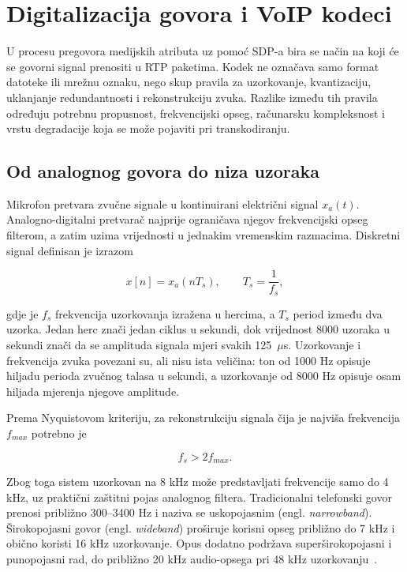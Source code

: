 \chapter{Digitalizacija govora i VoIP kodeci}
\label{ch:kodeci}

U procesu pregovora medijskih atributa uz pomoć SDP-a bira se način na koji će se govorni signal prenositi u RTP paketima. Kodek ne označava samo format datoteke ili mrežnu oznaku, nego skup pravila za uzorkovanje, kvantizaciju, uklanjanje redundantnosti i rekonstrukciju zvuka. Razlike između tih pravila određuju potrebnu propusnost, frekvencijski opseg, računarsku kompleksnost i vrstu degradacije koja se može pojaviti pri transkodiranju.

\section{Od analognog govora do niza uzoraka}

Mikrofon pretvara zvučne signale u kontinuirani električni signal $x_a(t)$. Analogno-digitalni pretvarač najprije ograničava njegov frekvencijski opseg filterom, a zatim uzima vrijednosti u jednakim vremenskim razmacima. Diskretni signal definisan je izrazom

\begin{equation}
x[n]=x_a(nT_s), \qquad T_s=\frac{1}{f_s},
\end{equation}

gdje je $f_s$ frekvencija uzorkovanja izražena u hercima, a $T_s$ period između dva uzorka. Jedan herc znači jedan ciklus u sekundi, dok vrijednost 8000 uzoraka u sekundi znači da se amplituda signala mjeri svakih 125~$\mu$s. Uzorkovanje i frekvencija zvuka povezani su, ali nisu ista veličina: ton od 1000 Hz opisuje hiljadu perioda zvučnog talasa u sekundi, a uzorkovanje od 8000 Hz opisuje osam hiljada mjerenja njegove amplitude.

Prema Nyquistovom kriteriju, za rekonstrukciju signala čija je najviša frekvencija $f_{max}$ potrebno je~\cite{oppenheim-schafer}

\begin{equation}
f_s > 2f_{max}.
\end{equation}

Zbog toga sistem uzorkovan na 8 kHz može predstavljati frekvencije samo do 4 kHz, uz praktični zaštitni pojas analognog filtera. Tradicionalni telefonski govor prenosi približno 300--3400 Hz i naziva se uskopojasnim (engl. \emph{narrowband}). Širokopojasni govor (engl. \emph{wideband}) proširuje korisni opseg približno do 7 kHz i obično koristi 16 kHz uzorkovanje. Opus dodatno podržava superširokopojasni i punopojasni rad, do približno 20 kHz audio-opsega pri 48 kHz uzorkovanju~\cite{rfc6716}.


